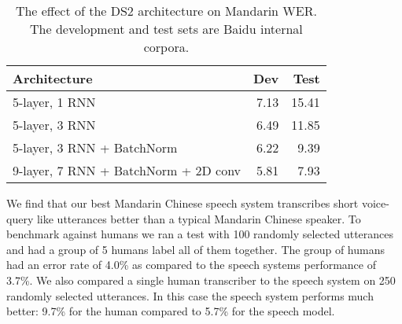 \begin{table}[ht!]
\centering
\begin{tabular}{l  r  r  }
\toprule
Architecture & Dev & Test \\
\midrule
5-layer, 1 RNN                & 7.13  & 15.41 \\
5-layer, 3 RNN                & 6.49  & 11.85 \\
5-layer, 3 RNN + BatchNorm           & 6.22  & 9.39 \\
9-layer, 7 RNN + BatchNorm + 2D conv & 5.81  & 7.93 \\
\bottomrule
\end{tabular}
\caption{The effect of the DS2 architecture on Mandarin WER. The development
         and test sets are Baidu internal corpora.}
\label{table:scaling_asr:results_mandarin}
\end{table}

We find that our best Mandarin Chinese speech system transcribes short
voice-query like utterances better than a typical Mandarin Chinese speaker. To
benchmark against humans we ran a test with 100 randomly selected utterances
and had a group of 5 humans label all of them together. The group of humans had
an error rate of 4.0\% as compared to the speech systems performance of 3.7\%.
We also compared a single human transcriber to the speech system on 250
randomly selected utterances. In this case the speech system performs much
better: 9.7\% for the human compared to 5.7\% for the speech model.

